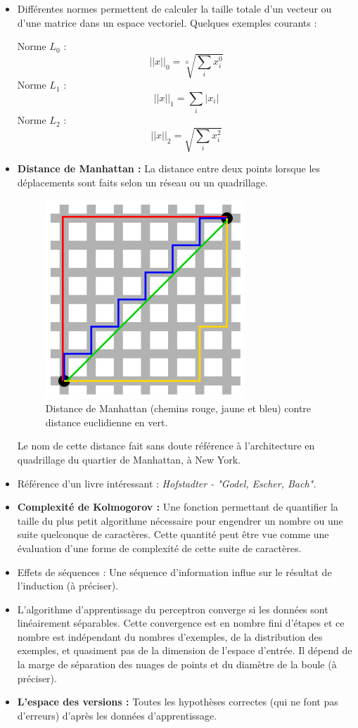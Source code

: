 \documentclass{article}
\begin{document}
\begin{itemize}
\item Différentes normes permettent de calculer la taille totale d'un vecteur ou d'une matrice dans un espace vectoriel. Quelques exemples courants : 

      Norme $L_0$ :
            \[ ||x||_0 = \sqrt[0]{\sum_i x_i^0} \]
      Norme $L_1$ :
            \[ ||x||_1 = \sum_i |x_i| \]
      Norme $L_2$ :
            \[ ||x||_2 = \sqrt{\sum_i x^2_i} \]
            
\item \textbf{Distance de Manhattan :} La distance entre deux points lorsque les déplacements sont faits selon un réseau ou un quadrillage. 

\begin{figure}[H]
    \begin{center} \includegraphics[scale=0.5]{manhattan.png} \end{center}
     \caption{Distance de Manhattan (chemins rouge, jaune et bleu) contre distance euclidienne en vert.}
\end{figure}

Le nom de cette distance fait sans doute référence à l'architecture en quadrillage du quartier de Manhattan, à New York.

\item Référence d'un livre intéressant : \textit{Hofstadter - "Godel, Escher, Bach".}
\item \textbf{Complexité de Kolmogorov :} Une fonction permettant de quantifier la taille du plus petit algorithme nécessaire pour engendrer un nombre ou une suite quelconque de caractères. Cette quantité peut être vue comme une évaluation d'une forme de complexité de cette suite de caractères.
\item Effets de séquences : Une séquence d'information influe sur le résultat de l'induction (à préciser).
\item L'algorithme d'apprentissage du perceptron converge si les données sont linéairement séparables. Cette convergence est en nombre fini d'étapes et ce nombre est indépendant du nombres d'exemples, de la distribution des exemples, et quasiment pas de la dimension de l'espace d'entrée. Il dépend de la marge de séparation des nuages de points et du diamètre de la boule (à préciser).
\item \textbf{L'espace des versions :} Toutes les hypothèses correctes (qui ne font pas d'erreurs) d'après les données d'apprentissage.
\end{itemize}
\end{document}
